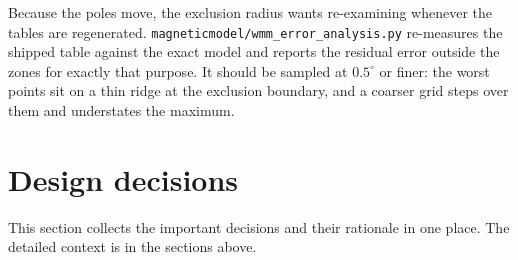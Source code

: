 \documentclass[11pt,a4paper]{article}
\newcommand{\code}[1]{\texttt{#1}}
\begin{document}
Because the poles move, the exclusion radius wants re-examining whenever
the tables are regenerated. \code{magneticmodel/wmm\_\allowbreak{}error\_\allowbreak{}analysis.py}
re-measures the shipped table against the exact model and reports the
residual error outside the zones for exactly that purpose. It should be sampled
at $0.5^\circ$ or finer: the worst points sit on a thin ridge at the
exclusion boundary, and a coarser grid steps over them and understates
the maximum.

\section{Design decisions}
\label{sec:decisions}

This section collects the important decisions and their rationale in
one place. The detailed context is in the sections above.
\end{document}

